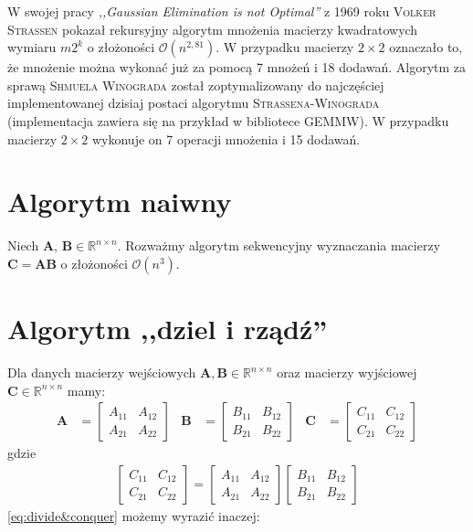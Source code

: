 W swojej pracy \emph{,,Gaussian Elimination is not Optimal''} z 1969 roku \textsc{Volker Strassen} pokazał rekursyjny algorytm mnożenia macierzy kwadratowych wymiaru \(m2^k\) o złożoności \(\mathcal{O}(n^{2,81})\)\cite{Strassen68}. W przypadku macierzy \(2\times 2\) oznaczało to, że mnożenie można wykonać już za pomocą 7 mnożeń i 18 dodawań. Algorytm za sprawą \textsc{Shmuela Winograda} został zoptymalizowany\cite{Winograd}\cite{Loeckx1974} do najczęściej implementowanej dzisiaj postaci algorytmu \textsc{Strassena-Winograda} (implementacja zawiera się na przykład w bibliotece GEMMW\cite{Douglas94gemmw}). W przypadku macierzy \(2\times 2\) wykonuje on 7 operacji mnożenia i 15 dodawań\cite{DBLP:journals/corr/abs-1202-3173}.
\section{Algorytm naiwny}
Niech \(\mathbf{A}\), \(\mathbf{B}\in\mathbb{R}^{n\times n}\). Rozważmy algorytm sekwencyjny wyznaczania macierzy \(\mathbf{C}=\mathbf{AB}\) o złożoności \(\mathcal{O}(n^3)\).


\newpage
\section{Algorytm ,,dziel i rządź''}
Dla danych macierzy wejściowych \(\mathbf{A}, \mathbf{B}\in\mathbb{R}^{n\times n}\) oraz macierzy wyjściowej \(\mathbf{C}\in\mathbb{R}^{n\times n}\) mamy:
\begin{align*}
\mathbf{A}& = \begin{bmatrix} A_{11}& A_{12} \\ A_{21}& A_{22} \end{bmatrix}&
\mathbf{B}& = \begin{bmatrix} B_{11}& B_{12} \\ B_{21}& B_{22} \end{bmatrix}&
\mathbf{C}& = \begin{bmatrix} C_{11}& C_{12} \\ C_{21}& C_{22} \end{bmatrix}
\end{align*}
gdzie
\begin{align}\label{eq:divide&conquer}
\begin{bmatrix} C_{11}& C_{12} \\ C_{21}& C_{22}\end{bmatrix}=
\begin{bmatrix} A_{11}& A_{12} \\ A_{21}& A_{22}\end{bmatrix}
\begin{bmatrix} B_{11}& B_{12} \\ B_{21}& B_{22}\end{bmatrix}
\end{align}
\eqref{eq:divide&conquer} możemy wyrazić inaczej:

